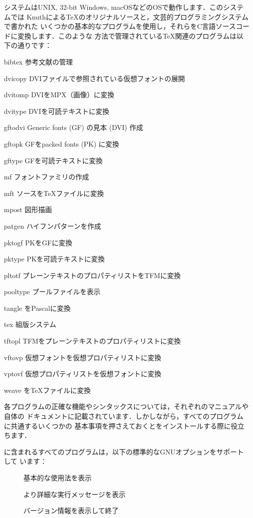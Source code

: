 \documentclass[uplatex,dvipdfmx,tombow]{jsarticle}
\begin{document}
\Webc システムはUNIX, 32-bit Windows, macOSなどのOSで動作します．このシステムでは
Knuthによる\TeX のオリジナルソースと，文芸的プログラミングシステム\WEB で書かれた
いくつかの基本的なプログラムを使用し，それらをC言語ソースコードに変換します．このような
方法で管理されている\TeX 関連のプログラムは以下の通りです：
%
\begin{cmddescription}
\item[bibtex] 参考文献の管理
\item[dvicopy] DVIファイルで参照されている仮想フォントの展開
\item[dvitomp] DVIをMPX（\MP 画像）に変換
\item[dvitype] DVIを可読テキストに変換
\item[gftodvi] Generic fonts (GF) の見本 (DVI) 作成
\item[gftopk] GFをpacked fonts (PK) に変換
\item[gftype] GFを可読テキストに変換
\item[mf] フォントファミリの作成
\item[mft] \MF ソースを\TeX ファイルに変換
\item[mpost] 図形描画
\item[patgen] ハイフンパターンを作成
\item[pktogf] PKをGFに変換
\item[pktype] PKを可読テキストに変換
\item[pltotf] プレーンテキストのプロパティリストをTFMに変換
\item[pooltype] \WEB プールファイルを表示
\item[tangle] \WEB をPascalに変換
\item[tex] 組版システム
\item[tftopl] TFMをプレーンテキストのプロパティリストに変換
\item[vftovp] 仮想フォントを仮想プロパティリストに変換
\item[vptovf] 仮想プロパティリストを仮想フォントに変換
\item[weave] \WEB を\TeX ファイルに変換
\end{cmddescription}
%
各プログラムの正確な機能やシンタックスについては，それぞれのマニュアルや\Webc 自体の
ドキュメントに記載されています．しかしながら，すべてのプログラムに共通するいくつかの
基本事項を押さえておくと\Webc をインストールする際に役立ちます．

\Webc に含まれるすべてのプログラムは，以下の標準的なGNUオプションをサポートして
います：
%
\begin{description}
\item[] 基本的な使用法を表示
\item[] より詳細な実行メッセージを表示
\item[] バージョン情報を表示して終了
\end{description}
\end{document}
